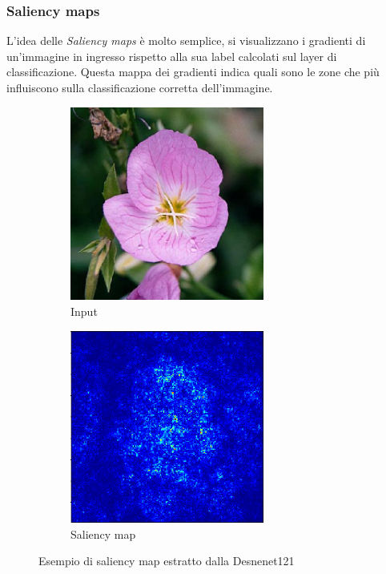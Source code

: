 \subsubsection{Saliency maps}
L'idea delle \textit{Saliency maps} è molto semplice, si visualizzano i gradienti di un'immagine in ingresso rispetto alla sua label calcolati sul layer di classificazione. Questa mappa dei gradienti indica quali sono le zone che più influiscono sulla classificazione corretta dell'immagine.

\begin{figure}[H]
  \begin{subfigure}[b]{0.45\textwidth}
  \centering
    \includegraphics[width=0.7\textwidth]{images/saliency-input}
    \caption{Input}
  \end{subfigure}
   \hfill
  \begin{subfigure}[b]{0.45\textwidth}
  \centering
    \includegraphics[width=0.7\textwidth]{images/saliency-output}
    \caption{Saliency map}
  \end{subfigure}
  \caption{Esempio di saliency map estratto dalla Desnenet121}
  \label{fig_saliency}
\end{figure}

